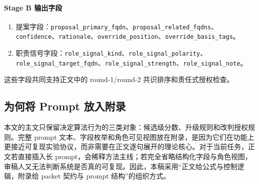 \documentclass[11pt,a4paper]{ctexart}
\begin{document}
\paragraph{Stage B 输出字段}
\begin{enumerate}[leftmargin=1.6em]
\item 提案字段：\texttt{proposal\_primary\_fqdn}、\texttt{proposal\_related\_fqdns}、\\
\texttt{confidence}、\texttt{rationale}、\texttt{override\_position}、\texttt{override\_basis\_tags}。
\item 职责信号字段：\texttt{role\_signal\_kind}、\texttt{role\_signal\_polarity}、\\
\texttt{role\_signal\_target\_fqdn}、\texttt{role\_signal\_strength}、\texttt{role\_signal\_note}。
\end{enumerate}

这些字段共同支持正文中的 round-1/round-2 共识排序和责任式授权检查。

\subsection{为何将 Prompt 放入附录}

本文的主文只保留决定算法行为的三类对象：候选级分数、升级规则和改判授权规则。完整 prompt 文本、字段枚举和角色可见视图放在附录，是因为它们在功能上更接近可复现实验协议，而非需要在正文逐句展开的理论核心。对于当前任务，正文若直接插入长 prompt，会稀释方法主线；若完全省略结构化字段与角色视图，审稿人又无法判断系统是否真的可复现。因此，本稿采用“正文给公式与控制逻辑，附录给 packet 契约与 prompt 结构”的组织方式。
\end{document}

